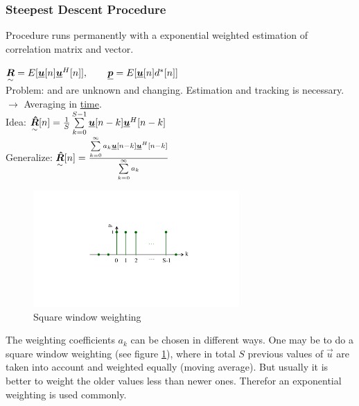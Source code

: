 \subsubsection{Steepest Descent Procedure}
Procedure runs permanently with a exponential weighted estimation of correlation matrix and vector.\\
\begin{doublespace}
$\underset{\sim}{\boldsymbol {R}}=E[\underline{\boldsymbol {u}}[n]\underline{\boldsymbol {u}}^H[n]], \qquad \underline{\boldsymbol {p}}=E[\underline{\boldsymbol {u}}[n]d^*[n]]$\\
Problem:  and  are unknown and changing. Estimation and tracking is necessary.\\
$\rightarrow$ Averaging in \underline{time}.\\
Idea: $\underset{\sim}{\boldsymbol {\hat{R}}}[n]=\frac{1}{S}\sum\limits_{k=0}^{S-1}\underline{\boldsymbol {u}}[n-k]\underline{\boldsymbol {u}}^H[n-k]$\\
Generalize: $\underset{\sim}{\boldsymbol {\hat{R}}}[n]=\frac{\sum\limits_{k=0}^{\infty}a_k\underline{\boldsymbol {u}}[n-k]\underline{\boldsymbol {u}}^H[n-k]}{\sum\limits_{k=0}^{\infty}a_k}$\\
\end{doublespace}
\begin{figure}[H]
	\centering
		\includegraphics[trim =4cm 7cm 5cm 4cm, clip, width=0.70\textwidth]{graphics/SDP_square_window.pdf}
	\caption{Square window weighting}
	\label{fig:SDP_square_window}
\end{figure}
The weighting coefficients  $a_k$ can be chosen in different ways. One may be to do a square window weighting (see figure \ref{fig:SDP_square_window}), where in total $S$ previous values of $\vec{u}$ are taken into account and weighted equally (moving average). But usually it is better to weight the older values less than newer ones. Therefor an exponential weighting  is used commonly.\\
\\

